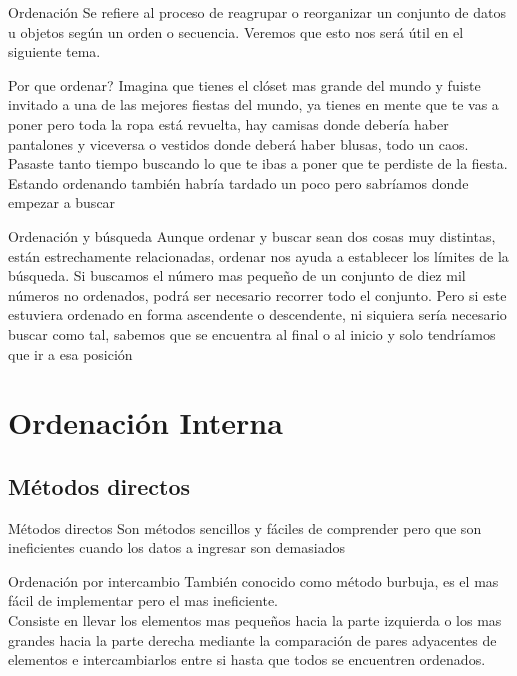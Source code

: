 \documentclass{beamer}
\begin{document}
\begin{frame}{Ordenaci\'on}
	Se refiere al proceso de reagrupar o reorganizar un conjunto de datos u objetos seg\'un un orden o secuencia.
	Veremos que esto nos ser\'a \'util en el siguiente tema.
\end{frame}

\begin{frame}{\textquestiondown Por que ordenar?}
	Imagina que tienes el cl\'oset mas grande del mundo y fuiste invitado a una de las mejores fiestas del mundo, ya tienes en mente que te  vas
	a poner pero toda la ropa est\'a revuelta, hay camisas  donde debería haber pantalones y viceversa o vestidos donde deber\'a haber blusas, todo un caos.
	Pasaste tanto tiempo buscando lo que te ibas a poner que te perdiste de la fiesta.
	Estando ordenando tambi\'en habr\'ia tardado un poco pero sabr\'iamos donde empezar a buscar
\end{frame}

\begin{frame}{Ordenaci\'on y b\'usqueda}
	Aunque ordenar y buscar sean dos cosas muy distintas, est\'an estrechamente relacionadas, ordenar nos ayuda a establecer los l\'imites de la b\'usqueda.
	Si buscamos el n\'umero mas pequeño de un conjunto de diez mil n\'umeros no ordenados, podr\'a ser necesario recorrer todo el conjunto.
	Pero si este estuviera ordenado en forma ascendente o descendente, ni siquiera ser\'ia necesario buscar como tal, sabemos que se encuentra al final o al inicio y
	solo tendr\'iamos que ir a esa posici\'on
\end{frame}

\section{Ordenaci\'on Interna}

\subsection{M\'etodos directos}
\begin{frame}{M\'etodos directos}
	Son m\'etodos sencillos y f\'aciles de comprender pero que son ineficientes cuando los datos a ingresar son demasiados
\end{frame}

\begin{frame}{Ordenaci\'on por intercambio}
	Tambi\'en conocido como m\'etodo burbuja, es el mas f\'acil de implementar pero el mas ineficiente.\\
	Consiste en llevar los elementos mas pequeños hacia la parte izquierda o los mas grandes hacia la parte derecha mediante la
	comparaci\'on de pares adyacentes de elementos e intercambiarlos entre si hasta que todos se encuentren ordenados.
\end{frame}
\end{document}

